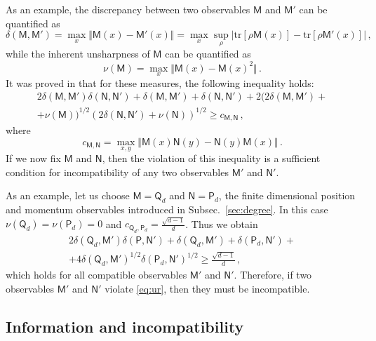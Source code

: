 \documentclass[12pt]{article}
\theoremstyle{definition}
\newcommand{\Mo}{\mathsf{M}}%
\newcommand{\No}{\mathsf{N}}%
\newcommand{\Po}{\mathsf{P}}%
\newcommand{\Qo}{\mathsf{Q}}%
\begin{document}
As an example, the discrepancy between two observables $\Mo$ and $\Mo'$ can be quantified as
\begin{equation}
\delta(\Mo, \Mo') 
= \max_x \Vert \Mo(x) -\Mo'(x)\Vert 
= \max_x \sup_{\rho} \left| \mbox{tr}[\rho\Mo(x)] 
- \mbox{tr}[\rho \Mo'(x)]\right| \, , 
\end{equation}
while the inherent unsharpness of $\Mo$ can be quantified as
\begin{equation}
\nu(\Mo)=\max_x \Vert \Mo(x) -\Mo(x)^2\Vert \, .
\end{equation}
It was proved in \cite{MiIm08} that for these measures, the following inequality holds:
\begin{multline*}
2 \delta(\Mo, \Mo') 
\delta(\No, \No') + 
\delta(\Mo, \Mo') + \delta(\No, \No') 
+2 (2 \delta(\Mo, \Mo') + \\
+ \nu(\Mo))^{1/2} 
(2 \delta(\No, \No') + \nu(\No))^{1/2} 
\geq c_{\Mo,\No} \, ,  
\end{multline*}
where 
\begin{equation}
c_{\Mo,\No} =  \max_{x,y} \Vert  \Mo(x)\No(y) - \No(y)\Mo(x) \Vert \, . 
\end{equation}
If we now fix $\Mo$ and $\No$, then the violation of this inequality is a sufficient condition for incompatibility of any two observables $\Mo'$ and $\No'$.

As an example, let us choose $\Mo=\Qo_d$ and $\No=\Po_d$, the finite dimensional position and momentum observables introduced in Subsec.~\ref{sec:degree}.
In this case $\nu(\Qo_d) = \nu(\Po_d)=0$ and $c_{\Qo_d,\Po_d} = \frac{\sqrt{d-1}}{d}$.
Thus we obtain 
\begin{multline}\label{eq:ur}
2 \delta(\Qo_d, \Mo') 
\delta(\Po, \No') + 
\delta(\Qo_d, \Mo') + \delta(\Po_d, \No') + \\
+4 \delta(\Qo_d, \Mo')^{1/2}  
\delta(\Po_d, \No')^{1/2}  
\geq \frac{\sqrt{d-1}}{d} \, , 
\end{multline} 
which holds for all compatible observables $\Mo'$ and $\No'$. 
Therefore, if two observables  $\Mo'$ and $\No'$ violate \eqref{eq:ur}, then they must be incompatible. 

\subsection{Information and incompatibility}\label{sec:ic}
\end{document}
